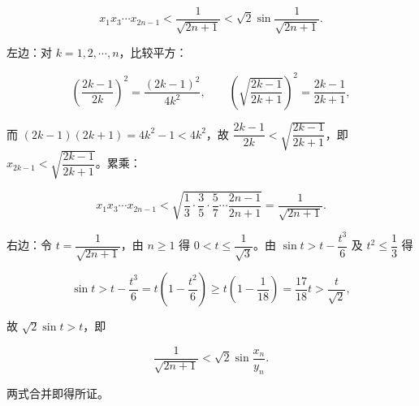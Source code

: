 \begin{answer}
\nopagebreak[4]
\[x_1x_3\cdots x_{2n-1}<\frac1{\sqrt{2n+1}}<\sqrt2\sin\frac1{\sqrt{2n+1}}.\]

左边：对 $k=1,2,\cdots,n$，比较平方：

\nopagebreak[4]
\[\left(\frac{2k-1}{2k}\right)^2=\frac{(2k-1)^2}{4k^2},\qquad \left(\sqrt{\frac{2k-1}{2k+1}}\right)^2=\frac{2k-1}{2k+1},\]

而 $(2k-1)(2k+1)=4k^2-1<4k^2$，故 $\dfrac{2k-1}{2k}<\sqrt{\dfrac{2k-1}{2k+1}}$，即 $x_{2k-1}<\sqrt{\dfrac{2k-1}{2k+1}}$。累乘：

\nopagebreak[4]
\[x_1x_3\cdots x_{2n-1}<\sqrt{\frac13\cdot\frac35\cdot\frac57\cdots\frac{2n-1}{2n+1}}=\frac1{\sqrt{2n+1}}.\]

右边：令 $t=\dfrac1{\sqrt{2n+1}}$，由 $n\geqslant1$ 得 $0<t\leqslant\dfrac1{\sqrt3}$。由 $\sin t>t-\dfrac{t^3}{6}$ 及 $t^2\leqslant\dfrac13$ 得

\nopagebreak[4]
\[\sin t>t-\frac{t^3}{6}=t\left(1-\frac{t^2}{6}\right)\geqslant t\left(1-\frac1{18}\right)=\frac{17}{18}t>\frac{t}{\sqrt2},\]

故 $\sqrt2\sin t>t$，即

\nopagebreak[4]
\[\frac1{\sqrt{2n+1}}<\sqrt2\sin\frac{x_n}{y_n}.\]

两式合并即得所证。


\end{answer}